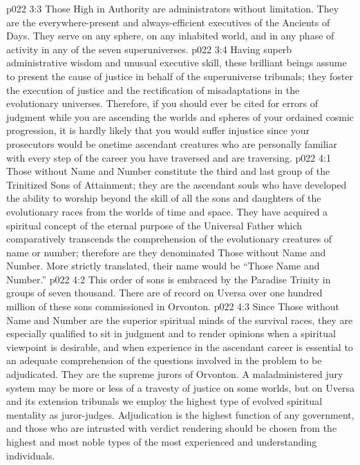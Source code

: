\vs p022 3:3 Those High in Authority are administrators without limitation. They are the everywhere\hyp{}present and always\hyp{}efficient executives of the Ancients of Days. They serve on any sphere, on any inhabited world, and in any phase of activity in any of the seven superuniverses.
\vs p022 3:4 Having superb administrative wisdom and unusual executive skill, these brilliant beings assume to present the cause of justice in behalf of the superuniverse tribunals; they foster the execution of justice and the rectification of misadaptations in the evolutionary universes. Therefore, if you should ever be cited for errors of judgment while you are ascending the worlds and spheres of your ordained cosmic progression, it is hardly likely that you would suffer injustice since your prosecutors would be onetime ascendant creatures who are personally familiar with every step of the career you have traversed and are traversing.
\vs p022 4:1 Those without Name and Number constitute the third and last group of the Trinitized Sons of Attainment; they are the ascendant souls who have developed the ability to worship beyond the skill of all the sons and daughters of the evolutionary races from the worlds of time and space. They have acquired a spiritual concept of the eternal purpose of the Universal Father which comparatively transcends the comprehension of the evolutionary creatures of name or number; therefore are they denominated Those without Name and Number. More strictly translated, their name would be “Those  Name and Number.”
\vs p022 4:2 This order of sons is embraced by the Paradise Trinity in groups of seven thousand. There are of record on Uversa over one hundred million of these sons commissioned in Orvonton.
\vs p022 4:3 Since Those without Name and Number are the superior spiritual minds of the survival races, they are especially qualified to sit in judgment and to render opinions when a spiritual viewpoint is desirable, and when experience in the ascendant career is essential to an adequate comprehension of the questions involved in the problem to be adjudicated. They are the supreme jurors of Orvonton. A maladministered jury system may be more or less of a travesty of justice on some worlds, but on Uversa and its extension tribunals we employ the highest type of evolved spiritual mentality as juror\hyp{}judges. Adjudication is the highest function of any government, and those who are intrusted with verdict rendering should be chosen from the highest and most noble types of the most experienced and understanding individuals.
